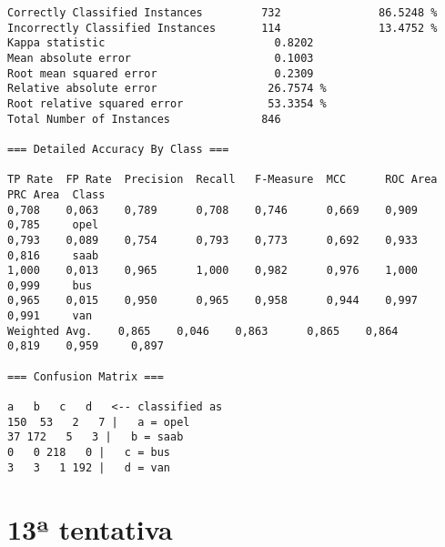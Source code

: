 \documentclass[
	article,			%
	11pt,				%
	oneside,			%
	a4paper,			%
	english,			%
	brazil,				%
	sumario=tradicional
	]{abntex2}
\begin{document}
\begin{lstlisting}
Correctly Classified Instances         732               86.5248 %
Incorrectly Classified Instances       114               13.4752 %
Kappa statistic                          0.8202
Mean absolute error                      0.1003
Root mean squared error                  0.2309
Relative absolute error                 26.7574 %
Root relative squared error             53.3354 %
Total Number of Instances              846     

=== Detailed Accuracy By Class ===

TP Rate  FP Rate  Precision  Recall   F-Measure  MCC      ROC Area  PRC Area  Class
0,708    0,063    0,789      0,708    0,746      0,669    0,909     0,785     opel
0,793    0,089    0,754      0,793    0,773      0,692    0,933     0,816     saab
1,000    0,013    0,965      1,000    0,982      0,976    1,000     0,999     bus
0,965    0,015    0,950      0,965    0,958      0,944    0,997     0,991     van
Weighted Avg.    0,865    0,046    0,863      0,865    0,864      0,819    0,959     0,897     

=== Confusion Matrix ===

a   b   c   d   <-- classified as
150  53   2   7 |   a = opel
37 172   5   3 |   b = saab
0   0 218   0 |   c = bus
3   3   1 192 |   d = van

\end{lstlisting}

\section{13ª tentativa}
\end{document}

